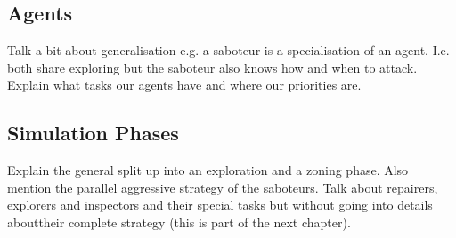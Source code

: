 \subsection{Agents}
Talk a bit about generalisation e.g. a saboteur is a specialisation of an agent. I.e. both share exploring but the saboteur also knows how and when to attack. Explain what tasks our agents have and where our priorities are.
\subsection{Simulation Phases}
Explain the general split up into an exploration and a zoning phase. Also mention the parallel aggressive strategy of the saboteurs. Talk about repairers, explorers and inspectors and their special tasks but without going into details abouttheir complete strategy (this is part of the next chapter).
